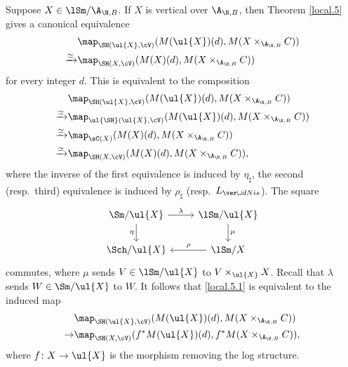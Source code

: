 \documentclass[10pt]{amsart}
\begin{document}
\begin{rmk}
\label{local.9}
Suppose $X\in \lSm/\A_{\N,B}$.
If $X$ is vertical over $\A_{\N,B}$, then Theorem \ref{local.5} gives a canonical equivalence
\begin{equation}
\label{local.5.1}
\begin{split}
&\map_{\SH(\ul{X},\cV)}
(M(\ul{X})(d),M(X\times_{\A_{\N,B}}C))
\\
\xrightarrow{\simeq}&
\map_{\SH(X,\cV)}
(M(X)(d),M(X\times_{\A_{\N,B}}C))
\end{split}
\end{equation}
for every integer $d$.
This is equivalent to the composition
\begin{align*}
&\map_{\SH(\ul{X},\cV)}
(M(\ul{X})(d),M(X\times_{\A_{\N,B}}C))
\\
\xrightarrow{\simeq}&
\map_{\ul{\SH}(\ul{X},\cV)}
(M(\ul{X})(d),M(X\times_{\A_{\N,B}}C))
\\
\xrightarrow{\simeq}&
\map_{\sC(X)}
(M(X)(d),M(X\times_{\A_{\N,B}}C))
\\
\xrightarrow{\simeq}&
\map_{\SH(X,\cV)}
(M(X)(d),M(X\times_{\A_{\N,B}}C)),
\end{align*}
where the inverse of the first equivalence is induced by $\eta_\sharp$, the second (resp.\ third) equivalence is induced by $\rho_\sharp$ (resp.\ $L_{\ver\cup dNis}$).
The square
\[
\begin{tikzcd}
\Sm/\ul{X}\ar[r,"\lambda"]\ar[d,"\eta"']&
\lSm/\ul{X}\ar[d,"\mu"]
\\
\Sch/\ul{X}\ar[r,leftarrow,"\rho"]&
\lSm/X
\end{tikzcd}
\]
commutes, where $\mu$ sends $V\in \lSm/\ul{X}$ to $V\times_{\ul{X}} X$.
Recall that $\lambda$ sends $W\in \Sm/\ul{X}$ to $W$.
It follows that \eqref{local.5.1} is equivalent to the induced map
\begin{align*}
&\map_{\SH(\ul{X},\cV)}
(M(\ul{X})(d),M(X\times_{\A_{\N,B}}C))
\\
\to &
\map_{\SH(X,\cV)}
(f^*M(\ul{X})(d),f^*M(X\times_{\A_{\N,B}}C)),
\end{align*}
where $f\colon X\to \ul{X}$ is the morphism removing the log structure.
\end{rmk}
\end{document}
